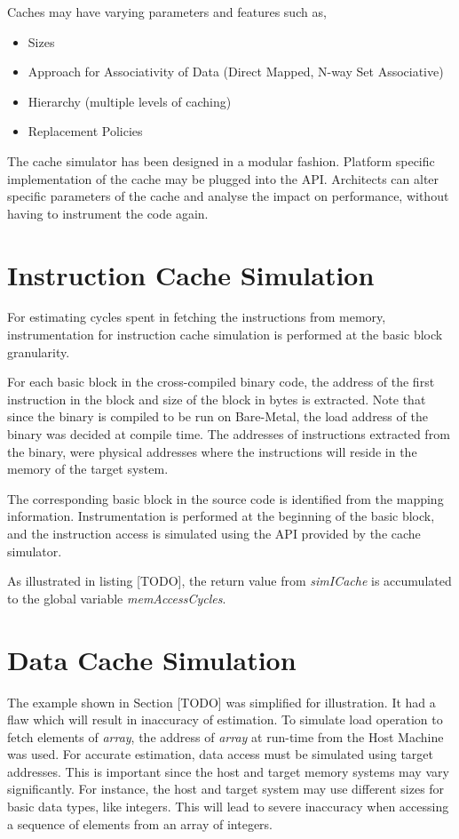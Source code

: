 Caches may have varying parameters and features such as,
\begin{itemize} \itemsep -6pt
\item Sizes
\item Approach for Associativity of Data (Direct Mapped, N-way Set Associative)
\item Hierarchy (multiple levels of caching)
\item Replacement Policies
\end{itemize}

The cache simulator has been designed in a modular fashion. Platform specific implementation of the cache may be plugged into the API. Architects can alter specific parameters of the cache and analyse the impact on performance, without having to instrument the code again.

\section{Instruction Cache Simulation}
For estimating cycles spent in fetching the instructions from memory, instrumentation for instruction cache simulation is performed at the basic block granularity. 

For each basic block in the cross-compiled binary code, the address of the first instruction in the block and size of the block in bytes is extracted. Note that since the binary is compiled to be run on Bare-Metal, the load address of the binary was decided at compile time. The addresses of instructions extracted from the binary, were physical addresses where the instructions will reside in the memory of the target system.

The corresponding basic block in the source code is identified from the mapping information. Instrumentation is performed at the beginning of the basic block, and the instruction access is simulated using the API provided by the cache simulator.

As illustrated in listing [TODO], the return value from \emph{simICache} is accumulated to the global variable \emph{memAccessCycles}.

\section{Data Cache Simulation}
The example shown in Section [TODO] was simplified for illustration. It had a flaw which will result in inaccuracy of estimation. To simulate load operation to fetch elements of \emph{array}, the address of \emph{array} at run-time from the Host Machine was used. For accurate estimation, data access must be simulated using target addresses. This is important since the host and target memory systems may vary significantly. For instance, the host and target system may use different sizes for basic data types, like integers. This will lead to severe inaccuracy when accessing a sequence of elements from an array of integers. 

